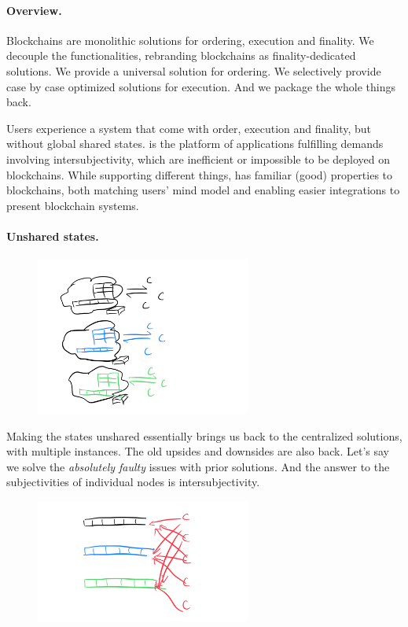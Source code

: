 \paragraph{Overview.}
Blockchains are monolithic solutions for ordering, execution and finality.
We decouple the functionalities, rebranding blockchains as finality-dedicated solutions.
We provide a universal solution for ordering.
We selectively provide case by case optimized solutions for execution.
And we package the whole things back.

Users experience a system that come with order, execution and finality, but without global shared states.
\sys is the platform of applications fulfilling demands involving intersubjectivity, which are inefficient or impossible to be deployed on blockchains.
While supporting different things, \sys has familiar (good) properties to blockchains, both matching users' mind model and enabling easier integrations to present blockchain systems.

\paragraph{Unshared states.}

\begin{figure}[H]
    \includegraphics[width=200pt]{graphs/IMG_0060}
    \Description{}
\end{figure}

Making the states unshared essentially brings us back to the centralized solutions, with multiple instances.
The old upsides and downsides are also back.
Let's say we solve the \emph{absolutely faulty} issues with prior solutions.
And the answer to the subjectivities of individual nodes is intersubjectivity.

\begin{figure}[H]
    \includegraphics[width=200pt]{graphs/IMG_0059}
    \Description{}
\end{figure}


